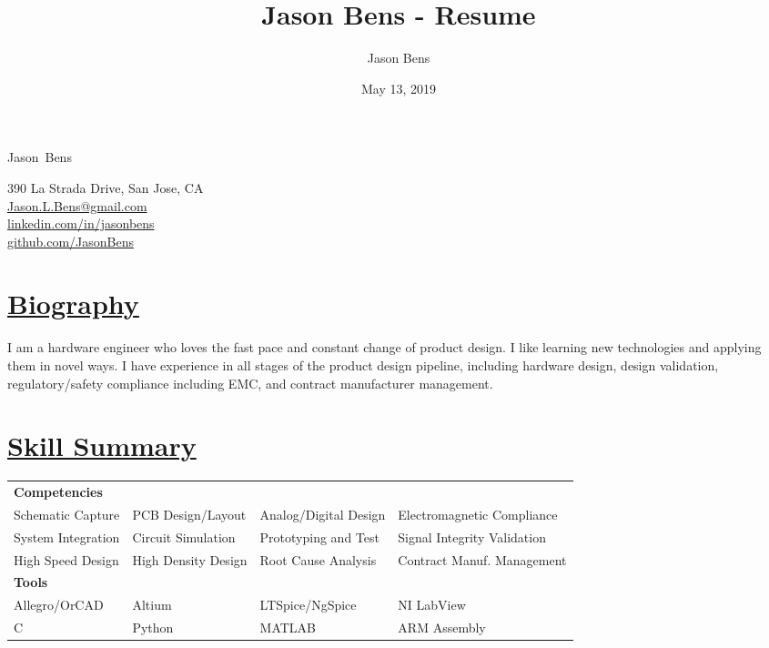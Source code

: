 \documentclass[a4paper, 11pt]{article}
\title{Jason Bens - Resume}
\author{Jason Bens}
\date{May 13, 2019}
\makeatletter
\newcommand {\firstname} {Jason}
\newcommand {\lastname} {Bens}
\newcommand {\address} {390 La Strada Drive, San Jose, CA}
\newcommand {\email} {\url{Jason.L.Bens@gmail.com}}
\newcommand {\linkedin} {\url{linkedin.com/in/jasonbens}}
\newcommand {\github} {\url{github.com/JasonBens}}
\newcommand {\careers} {\url{careers.stackoverflow.com/JasonBens}}
\makeatother
\begin{document}
\begin{minipage}[t]{0.4\textwidth}  
  \begin{flushright}
    {\Huge \firstname~\lastname}
  \end{flushright}
\end{minipage}
\hfill
\begin{minipage}{0.42\textwidth}
  \begin{flushright}
    \address \\
    \email \\
    \linkedin \\
    \github \\
  \end{flushright}
\end{minipage}

\hrulefill

\section{\underline{Biography}}
I am a hardware engineer who loves the fast pace and constant change of product design. I like learning new technologies and applying them in novel ways.  I have experience in all stages of the product design pipeline, including hardware design, design validation, regulatory/safety compliance including EMC, and contract manufacturer management.

\section{\underline{Skill Summary}}
  \begin{tabularx}{\textwidth}{l l l l}
    \textbf{Competencies} &  &  &\\
    Schematic Capture & PCB Design/Layout & Analog/Digital Design & Electromagnetic Compliance\\
    System Integration & Circuit Simulation & Prototyping and Test & Signal Integrity Validation\\
    High Speed Design & High Density Design & Root Cause Analysis & Contract Manuf. Management\\[5pt]
    \textbf{Tools} &  &  &\\
    Allegro/OrCAD & Altium & LTSpice/NgSpice & NI LabView\\
    C & Python & MATLAB & ARM Assembly
  \end{tabularx}
\end{document}
